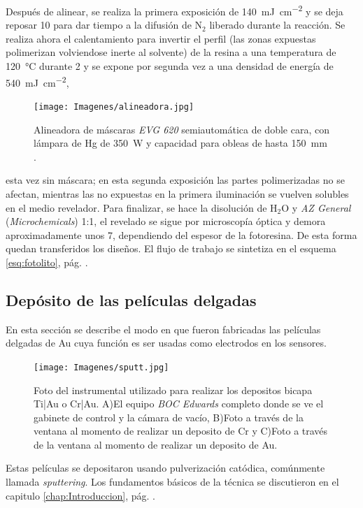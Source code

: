		Después de alinear, se realiza la primera exposición de \SI{140}{mJ.\cm^{-2}} y se deja reposar \SI{10}{\min} para dar tiempo a la difusión de N$_2$ liberado durante la reacción. Se realiza ahora el calentamiento para invertir el perfil (las zonas expuestas polimerizan volviendose inerte al solvente) de la resina a una temperatura de \SI{120}{\celsius} durante \SI{2}{\min}  y se expone por segunda vez a una densidad de energía de \SI{540}{mJ.cm^{-2}},
		\begin{figure}[ht]
			  \begin{center}
			  \texttt{[image: Imagenes/alineadora.jpg]}
			  \caption[Alineadora de máscaras]{Alineadora de máscaras \textit{EVG 620} semiautomática de doble cara, con lámpara de Hg de \SI{350}{W}  y capacidad para obleas de hasta \SI{150}{\mm} .}
			  \label{fig:alineadora}
			  \end{center}
			  \end{figure}	
		esta vez sin máscara; en esta segunda exposición las partes polimerizadas no se afectan, mientras las no expuestas en la primera iluminación se vuelven solubles en el medio revelador. Para finalizar, se hace la disolución de H$_2$O y \textit{AZ General} (\textit{Microchemicals}) 1:1, el revelado se sigue por microscopía óptica y demora aproximadamente unos \SI{7}{\min}, dependiendo del espesor de la fotoresina. De esta forma quedan transferidos los diseños. El flujo de trabajo se sintetiza en el esquema \ref{esq:fotolito}, pág. \pageref{esq:fotolito}.

	\subsection{Depósito de las películas delgadas}\label{sec:sputt}

			En esta sección se describe el modo en que fueron fabricadas las películas delgadas de Au cuya función es ser usadas como electrodos en los sensores. 
				  \begin{figure}[t!]
				  \begin{center}
				  \texttt{[image: Imagenes/sputt.jpg]}
				  \caption[Equipo para depósito de películas delgadas, \textit{sputtering}]{Foto del instrumental utilizado para realizar los depositos bicapa Ti|Au o Cr|Au. A)El equipo \textit{BOC Edwards} completo donde se ve el gabinete de control y la cámara de vacío, B)Foto a través de la ventana al momento de realizar un deposito de Cr y C)Foto a través de la ventana al momento de realizar un deposito de Au.}
				  \label{fig:sputt}
				  \end{center}
				  \end{figure}	
			Estas películas se depositaron usando pulverización catódica, comúnmente llamada \textit{sputtering}\cite{sigmund1968}. Los fundamentos básicos de la técnica se discutieron en el capitulo \ref{chap:Introduccion}, pág. \pageref{sec:microfabricacion}.

